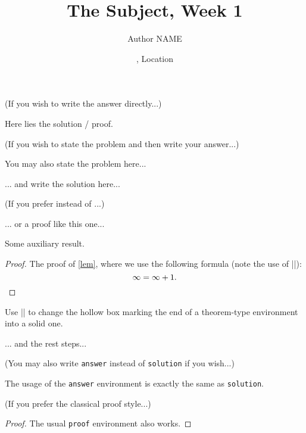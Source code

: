 \documentclass[11pt,
  logo = {example-image},
  title in boldface,
  theorem in new line,
  colored solution,
]{homework}
\title{The Subject, Week 1}
\author{Author NAME}
\date{\TheDate{2025-01-01}, Location}
\begin{document}
\textcolor{gray!55}{(If you wish to write the answer directly...)}

\begin{problem}
    Here lies the solution / proof.
\end{problem}


\bigskip\textcolor{gray!55}{(If you wish to state the problem and then write your answer...)}

\begin{problem}
    You may also state the problem here...
\end{problem}

\begin{solution}
    ... and write the solution here...
\end{solution}

\bigskip\textcolor{gray!55}{(If you prefer  instead of ...)}

\begin{solution}[Proof]
    ... or a proof like this one...
    \begin{lemma}\label{lem}
        Some auxiliary result.
    \end{lemma}
    \begin{proof}
        The proof of \cref{lem}, where we use the following formula (note the use of \cverb|\qedhere|):
        \[
            \infty = \infty + 1.
            \qedhere %
        \]
    \end{proof}
    \begin{fact}
        \proofless
        Use \cverb|\proofless| to change the hollow box marking the end of a theorem-type environment into a solid one.
    \end{fact}
    ... and the rest steps...
\end{solution}


\bigskip\textcolor{gray!55}{(You may also write \texttt{answer} instead of \texttt{solution} if you wish...)}

\begin{answer}
    The usage of the \verb|answer| environment is exactly the same as \verb|solution|.
\end{answer}


\bigskip\textcolor{gray!55}{(If you prefer the classical proof style...)}

\begin{proof}
    The usual \verb|proof| environment also works.
\end{proof}
\end{document}
